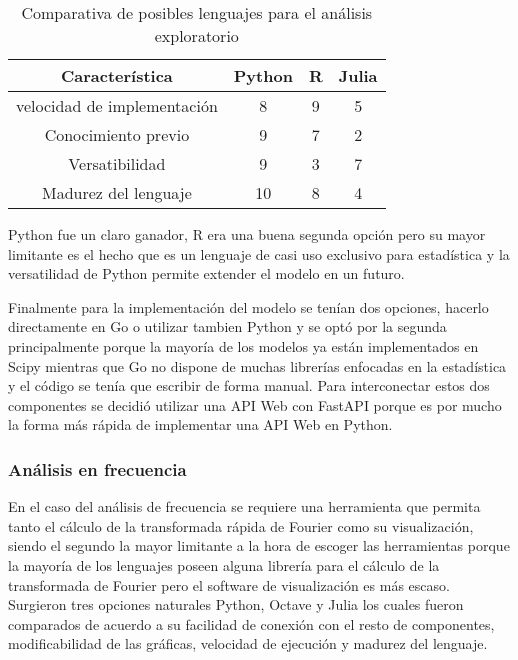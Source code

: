     \begin{table}[ht]
        \caption[Comparativa de posibles lenguajes para el análisis exploratorio]{Comparativa de posibles lenguajes para el análisis exploratorio}
        \label{tab:LenguajesServidor}
        \begin{center}
            \vspace{0.3cm}
            \begin{tabular}{|c|c|c|c|}
                \hline
                Característica              & Python & R & Julia\\\hline
                velocidad de implementación & 8     & 9     & 5 \\\hline
                Conocimiento previo         & 9     & 7     & 2 \\\hline
                Versatibilidad              & 9     & 3     & 7 \\\hline
                Madurez del lenguaje        & 10    & 8     & 4 \\\hline
                \hline
            \end{tabular}
        \end{center}
    \end{table}

    Python fue un claro ganador, R era una buena segunda opción pero su mayor
    limitante es el hecho que es un lenguaje de casi uso exclusivo para
    estadística y la versatilidad de Python  permite extender el modelo en un
    futuro.

    Finalmente para la implementación del modelo se tenían dos opciones,
    hacerlo directamente en Go o utilizar tambien Python y se optó por la
    segunda principalmente porque la mayoría de los modelos ya están
    implementados en Scipy mientras que Go no dispone de muchas librerías
    enfocadas en la estadística y el código se tenía que escribir de forma
    manual. Para interconectar estos dos componentes se decidió utilizar una
    API Web con FastAPI porque es por mucho la forma más rápida de implementar
    una API Web en Python.

    \subsubsection{Análisis en frecuencia}
    En el caso del análisis de frecuencia se requiere una herramienta que
    permita tanto el cálculo de la transformada rápida de Fourier como su
    visualización, siendo el segundo la mayor limitante a la hora de escoger
    las herramientas porque la mayoría de los lenguajes poseen alguna librería
    para el cálculo de la transformada de Fourier pero el software de
    visualización es más escaso. Surgieron tres opciones naturales Python,
    Octave y Julia los cuales fueron comparados de acuerdo a su facilidad de
    conexión con el resto de componentes, modificabilidad de las gráficas,
    velocidad de ejecución y madurez del lenguaje.

